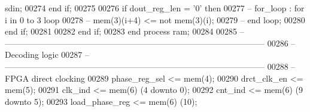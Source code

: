 \begin{DoxyCode}
{      sdin};
00274                 \textcolor{keywordflow}{end} \textcolor{keywordflow}{if};
00275                 
00276                 \textcolor{keywordflow}{if} \textcolor{vhdlchar}{dout_reg_len} \textcolor{vhdlchar}{=} \textcolor{vhdlchar}{'}\textcolor{vhdllogic}{}\textcolor{vhdllogic}{0}\textcolor{vhdlchar}{'} \textcolor{keywordflow}{then}
00277 \textcolor{keyword}{--                  for\_loop : for i in 0 to 3 loop                 }
00278 \textcolor{keyword}{--                      mem(3)(i+4) <= not mem(3)(i);}
00279 \textcolor{keyword}{--                  end loop;}
00280                 \textcolor{keywordflow}{end} \textcolor{keywordflow}{if};
00281                 
00282         \textcolor{keywordflow}{end} \textcolor{keywordflow}{if};
00283     \textcolor{keywordflow}{end} \textcolor{keywordflow}{process} \textcolor{vhdlchar}{ram};
00284     
00285 \textcolor{keyword}{    -- ---------------------------------------------------------------------------------------------}
00286 \textcolor{keyword}{    -- Decoding logic}
00287 \textcolor{keyword}{    -- ---------------------------------------------------------------------------------------------}
00288 \textcolor{keyword}{            --FPGA direct clocking}
00289         \textcolor{vhdlchar}{phase_reg_sel}   \textcolor{vhdlchar}{<=} \textcolor{vhdlchar}{mem}\textcolor{vhdlchar}{(}\textcolor{vhdllogic}{}\textcolor{vhdllogic}{4}\textcolor{vhdlchar}{)};
00290         \textcolor{vhdlchar}{drct_clk_en}     \textcolor{vhdlchar}{<=} \textcolor{vhdlchar}{mem}\textcolor{vhdlchar}{(}\textcolor{vhdllogic}{}\textcolor{vhdllogic}{5}\textcolor{vhdlchar}{)};
00291         \textcolor{vhdlchar}{clk_ind}         \textcolor{vhdlchar}{<=} \textcolor{vhdlchar}{mem}\textcolor{vhdlchar}{(}\textcolor{vhdllogic}{}\textcolor{vhdllogic}{6}\textcolor{vhdlchar}{)} \textcolor{vhdlchar}{(}\textcolor{vhdllogic}{}\textcolor{vhdllogic}{4} \textcolor{keywordflow}{downto} \textcolor{vhdllogic}{}\textcolor{vhdllogic}{0}\textcolor{vhdlchar}{)};
00292         \textcolor{vhdlchar}{cnt_ind}         \textcolor{vhdlchar}{<=} \textcolor{vhdlchar}{mem}\textcolor{vhdlchar}{(}\textcolor{vhdllogic}{}\textcolor{vhdllogic}{6}\textcolor{vhdlchar}{)} \textcolor{vhdlchar}{(}\textcolor{vhdllogic}{}\textcolor{vhdllogic}{9} \textcolor{keywordflow}{downto} \textcolor{vhdllogic}{}\textcolor{vhdllogic}{5}\textcolor{vhdlchar}{)};
00293         \textcolor{vhdlchar}{load_phase_reg}  \textcolor{vhdlchar}{<=} \textcolor{vhdlchar}{mem}\textcolor{vhdlchar}{(}\textcolor{vhdllogic}{}\textcolor{vhdllogic}{6}\textcolor{vhdlchar}{)} \textcolor{vhdlchar}{(}\textcolor{vhdllogic}{}\textcolor{vhdllogic}{10}\textcolor{vhdlchar}{)};

\end{DoxyCode}

